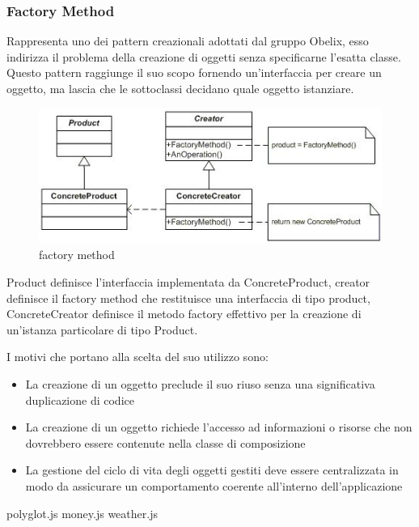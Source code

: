\subsubsection{Factory Method}
Rappresenta uno dei pattern creazionali adottati dal gruppo Obelix, esso  indirizza il problema della creazione di oggetti senza specificarne l'esatta classe. Questo pattern raggiunge il suo scopo fornendo un'interfaccia per creare un oggetto, ma lascia che le sottoclassi decidano quale oggetto istanziare.

	\FloatBarrier
	\begin{figure}[ht]
		\centering
		\includegraphics[scale=0.45]{img/method.jpg}
		\caption{factory method}
	\end{figure}


Product definisce l'interfaccia implementata da ConcreteProduct, creator definisce il factory method che restituisce una interfaccia di tipo product, ConcreteCreator definisce il metodo factory effettivo per la creazione di un’istanza particolare di tipo Product.


I motivi che portano alla scelta del suo utilizzo sono:

\begin{itemize}
\item La creazione di un oggetto preclude il suo riuso senza una significativa duplicazione di codice
\item  La creazione di un oggetto richiede l'accesso ad informazioni o risorse che non dovrebbero essere contenute nella classe di composizione
\item La gestione del ciclo di vita degli oggetti gestiti deve essere centralizzata in modo da assicurare un comportamento coerente all'interno dell'applicazione

\end{itemize}


polyglot.js
money.js
weather.js























